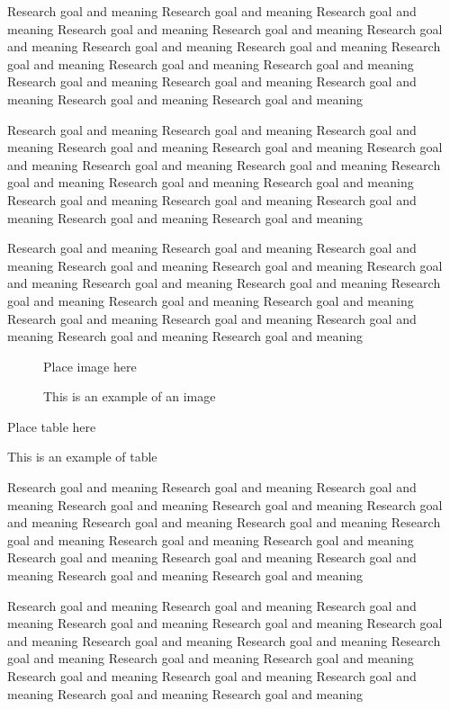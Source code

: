 \documentclass[12pt]{article} %
\begin{document}
Research goal and meaning Research goal and meaning Research goal and meaning Research goal and meaning
Research goal and meaning Research goal and meaning Research goal and meaning Research goal and meaning
Research goal and meaning Research goal and meaning Research goal and meaning Research goal and meaning
Research goal and meaning Research goal and meaning Research goal and meaning Research goal and meaning

Research goal and meaning Research goal and meaning Research goal and meaning Research goal and meaning
Research goal and meaning Research goal and meaning Research goal and meaning Research goal and meaning
Research goal and meaning Research goal and meaning Research goal and meaning Research goal and meaning
Research goal and meaning Research goal and meaning Research goal and meaning Research goal and meaning

Research goal and meaning Research goal and meaning Research goal and meaning Research goal and meaning
Research goal and meaning Research goal and meaning Research goal and meaning Research goal and meaning
Research goal and meaning Research goal and meaning Research goal and meaning Research goal and meaning
Research goal and meaning Research goal and meaning Research goal and meaning Research goal and meaning

\begin{figure}
\centerline{Place image here}
\caption{This is an example of an image}
\end{figure}

\begin{table}
\centerline{Place table here}
\caption{This is an example of table}
\end{table}

Research goal and meaning Research goal and meaning Research goal and meaning Research goal and meaning
Research goal and meaning Research goal and meaning Research goal and meaning Research goal and meaning
Research goal and meaning Research goal and meaning Research goal and meaning Research goal and meaning
Research goal and meaning Research goal and meaning Research goal and meaning Research goal and meaning

Research goal and meaning Research goal and meaning Research goal and meaning Research goal and meaning
Research goal and meaning Research goal and meaning Research goal and meaning Research goal and meaning
Research goal and meaning Research goal and meaning Research goal and meaning Research goal and meaning
Research goal and meaning Research goal and meaning Research goal and meaning Research goal and meaning
\end{document}
